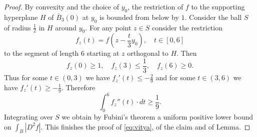 \documentclass[12pt,leqno,intlimits]{amsart}
\numberwithin{equation}{section}
\theoremstyle{definition}
\theoremstyle{remark}
\begin{document}
\begin{proof}
By convexity and the choice of $y_0$, the restriction of $f$ to the supporting hyperplane $H$ of $\bar B_3(0)$ at $y_0$ is bounded from below by $1$. Consider the ball $S$ of radius $\frac 1 2$ in $H$ around $y_0$. For any point $z\in S$ consider the restriction
$$f_z (t)= f(z- \frac t 3 y_0 ),\quad t\in [0,6]$$
to the segment of length $6$ starting at $z$ orthogonal to $H$.
Then 
$$f_z(0)\geq 1,\quad 
f_z (3)\leq \frac 1 3,\quad
f_z (6) \geq 0.$$
Thus for some $t\in (0,3)$ we have $f_z'(t) \leq -\frac 2 9$ and for some $t\in (3,6)$ we have $f_z'(t) \geq - \frac 1 9$.
Therefore
$$\int _0 ^6 f_z'' (t)\cdot dt \geq \frac 1 9.$$
Integrating over $S$ we obtain by Fubini's theorem a uniform positive lower bound on $\int _{B} |D^2f|$.
This finishes the proof of \eqref{eq:vitya}, of the claim and of Lemma.
\end{proof}
\end{document}
